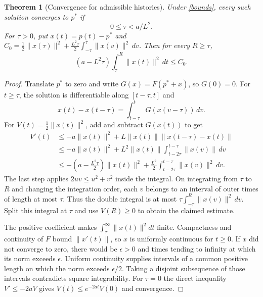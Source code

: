 \documentclass[11pt]{article}
\newtheorem{theorem}{Theorem}
\theoremstyle{remark}
\begin{document}
\begin{theorem}[Convergence for admissible histories]\label{global}
Under \eqref{bounds}, every such solution converges to $p^*$ if
\[
 0\leq\tau<a/L^2.
\]
For $\tau>0$, put $x(t)=p(t)-p^*$ and
$C_0=\frac12\|x(\tau)\|^2+
 \frac{L^2\tau}{2}\int_{-\tau}^{\tau}\|x(v)\|^2\,dv$.
Then for every $R\geq\tau$,
\[
 (a-L^2\tau)\int_\tau^R\|x(t)\|^2\,dt\leq C_0.
\]
\end{theorem}
\begin{proof}
Translate $p^*$ to zero and write $G(x)=F(p^*+x)$, so $G(0)=0$.
For $t\geq\tau$, the solution is differentiable along $[t-\tau,t]$ and
\[
 x(t)-x(t-\tau)=\int_{t-\tau}^tG(x(v-\tau))\,dv.
\]
For $V(t)=\frac12\|x(t)\|^2$, add and subtract $G(x(t))$ to get
\begin{align*}
 V'(t)&\leq-a\|x(t)\|^2
  +L\|x(t)\|\|x(t-\tau)-x(t)\|\\
 &\leq-a\|x(t)\|^2
  +L^2\|x(t)\|\int_{t-2\tau}^{t-\tau}\|x(v)\|\,dv\\
 &\leq-\left(a-\frac{L^2\tau}{2}\right)\|x(t)\|^2
  +\frac{L^2}{2}\int_{t-2\tau}^{t-\tau}\|x(v)\|^2\,dv.
\end{align*}
The last step applies $2uv\leq u^2+v^2$ inside the integral.
On integrating from $\tau$ to $R$ and changing the integration order,
each $v$ belongs to an interval of outer times of length at most $\tau$.
Thus the double integral is at most
$\tau\int_{-\tau}^{R}\|x(v)\|^2\,dv$. Split this integral at $\tau$
and use $V(R)\geq0$ to obtain the claimed estimate.

The positive coefficient makes $\int_\tau^\infty\|x(t)\|^2dt$ finite.
Compactness and continuity of $F$ bound $\|x'(t)\|$, so $x$ is uniformly
continuous for $t\geq0$. If $x$ did not converge to zero, there would
be $\epsilon>0$ and times tending to infinity at which its norm exceeds
$\epsilon$. Uniform continuity supplies intervals of a common positive
length on which the norm exceeds $\epsilon/2$. Taking a disjoint
subsequence of those intervals contradicts square integrability.
For $\tau=0$ the direct inequality $V'\leq-2aV$ gives
$V(t)\leq e^{-2at}V(0)$ and convergence.
\end{proof}
\end{document}

